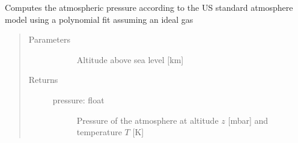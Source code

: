 \documentclass[letterpaper,10pt,english]{sphinxmanual}
\begin{document}

\begin{fulllineitems}
\label{\detokenize{stochprop.eofs:stochprop.eofs.pressure}}
Computes the atmospheric pressure according to the US standard atmosphere model using a polynomial fit assuming an ideal gas
\begin{quote}\begin{description}
\item[{Parameters}] \leavevmode\begin{description}
\item[{}] \leavevmode
Altitude above sea level {[}km{]}

\end{description}

\item[{Returns}] \leavevmode\begin{description}
\item[{pressure: float}] \leavevmode
Pressure of the atmosphere at altitude \(z\) {[}mbar{]} and temperature \(T\) {[}K{]}

\end{description}

\end{description}\end{quote}

\end{fulllineitems}

\end{document}
